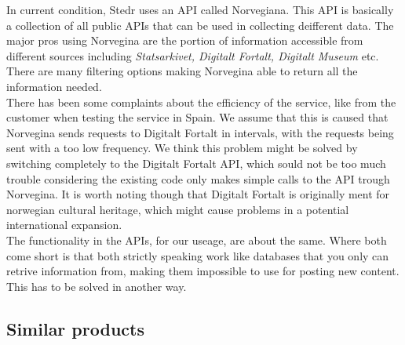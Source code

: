 In current condition, Stedr uses an API called Norvegiana. This API is basically a collection of all public APIs that can be used in collecting deifferent data. The major pros using Norvegina are the portion of information accessible from different sources including \emph{Statsarkivet, Digitalt Fortalt, Digitalt Museum} etc. There are many filtering options making Norvegina able to return all the information needed.\\
There has been some complaints about the efficiency of the service, like from the customer when testing the service in Spain. We assume that this is caused that Norvegina sends requests to Digitalt Fortalt in intervals, with the requests being sent with a too low frequency. We think this problem might be solved by switching completely to the Digitalt Fortalt API, which sould not be too much trouble considering the existing code only makes simple calls to the API trough Norvegina. It is worth noting though that Digitalt Fortalt is originally ment for norwegian cultural heritage, which might cause problems in a potential international expansion.\\
The functionality in the APIs, for our useage, are about the same. Where both come short is that both strictly speaking work like databases that you only can retrive information from, making them impossible to use for posting new content. This has to be solved in another way.\\ 


	\subsection{Similar products}
